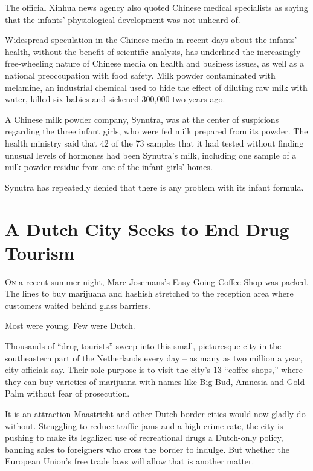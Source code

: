 ﻿\documentclass[12pt]{article}
\begin{document}
The official Xinhua news agency also quoted Chinese medical specialists as saying that the infants'
physiological development was not unheard of.

Widespread speculation in the Chinese media in recent days about the infants' health, without the
benefit of scientific analysis, has underlined the increasingly free-wheeling nature of Chinese
media on health and business issues, as well as a national preoccupation with food safety. Milk
powder contaminated with melamine, an industrial chemical used to hide the effect of diluting raw
milk with water, killed six babies and sickened 300,000 two years ago.

A Chinese milk powder company, Synutra, was at the center of suspicions regarding the three infant
girls, who were fed milk prepared from its powder. The health ministry said that 42 of the 73
samples that it had tested without finding unusual levels of hormones had been Synutra's milk,
including one sample of a milk powder residue from one of the infant girls' homes.

Synutra has repeatedly denied that there is any problem with its infant formula.

\section{A Dutch City Seeks to End Drug Tourism}

\lettrine{O}{n} a recent summer night, Marc Josemans's Easy Going Coffee
Shop was packed. The lines to buy marijuana and hashish stretched to the reception area where
customers waited behind glass barriers.

Most were young. Few were Dutch.

Thousands of ``drug tourists'' sweep into this small, picturesque city in the southeastern part of
the Netherlands every day -- as many as two million a year, city officials say. Their sole purpose
is to visit the city's 13 ``coffee shops,'' where they can buy varieties of marijuana with names
like Big Bud, Amnesia and Gold Palm without fear of prosecution.

It is an attraction Maastricht and other Dutch border cities would now gladly do without. Struggling
to reduce traffic jams and a high crime rate, the city is pushing to make its legalized use of
recreational drugs a Dutch-only policy, banning sales to foreigners who cross the border to indulge.
But whether the European Union's free trade laws will allow that is another matter.
\end{document}
